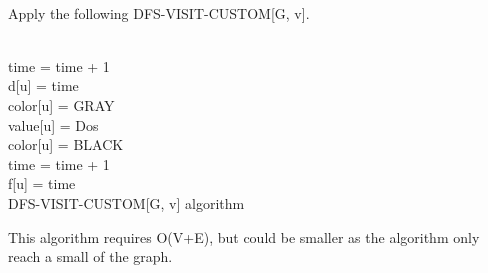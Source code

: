 \documentclass[11pt]{article}
\begin{document}
\begin{enumerate}
\begin{enumerate}
        \\ Apply the following DFS-VISIT-CUSTOM[G, v]. \\
        \begin{algorithm}[H]
        \Indm{}\\
        \Indp
            time = time + 1 \\
            d[u] = time \\
            color[u] = GRAY \\
            value[u] = Dos \\
            color[u] = BLACK \\
            time = time + 1 \\
            f[u] = time \\
            \caption{DFS-VISIT-CUSTOM[G, v] algorithm}
        \end{algorithm}
        This algorithm requires O(V+E), but could be smaller as the algorithm only reach a small of the graph.
    \end{enumerate}
\end{enumerate}
\end{document}
